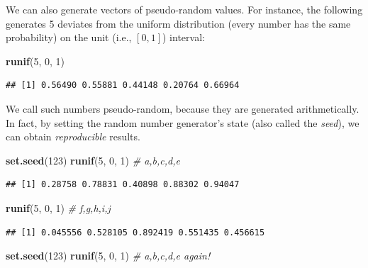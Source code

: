 \documentclass[10pt,b5paper,krantz1]{krantz}
\newenvironment{Shaded}{\begin{snugshade}}{\end{snugshade}}
\newcommand{\CommentTok}[1]{\textcolor[rgb]{0.37,0.37,0.37}{\textit{#1}}}
\newcommand{\DecValTok}[1]{\textcolor[rgb]{0.06,0.06,0.06}{#1}}
\newcommand{\KeywordTok}[1]{\textcolor[rgb]{0.27,0.27,0.27}{\textbf{#1}}}
\newcommand{\NormalTok}[1]{#1}
\begin{document}
We can also generate vectors of pseudo-random values.
For instance, the following generates 5 deviates from the uniform distribution
(every number has the same probability) on the unit (i.e., \([0,1]\)) interval:

\begin{Shaded}
\begin{Highlighting}[]
\KeywordTok{runif}\NormalTok{(}\DecValTok{5}\NormalTok{, }\DecValTok{0}\NormalTok{, }\DecValTok{1}\NormalTok{)}
\end{Highlighting}
\end{Shaded}

\begin{verbatim}
## [1] 0.56490 0.55881 0.44148 0.20764 0.66964
\end{verbatim}

We call such numbers pseudo-random, because they are generated arithmetically.
In fact, by setting the random number generator's state (also called the \emph{seed}),
we can obtain \emph{reproducible} results.

\begin{Shaded}
\begin{Highlighting}[]
\KeywordTok{set.seed}\NormalTok{(}\DecValTok{123}\NormalTok{)}
\KeywordTok{runif}\NormalTok{(}\DecValTok{5}\NormalTok{, }\DecValTok{0}\NormalTok{, }\DecValTok{1}\NormalTok{) }\CommentTok{# a,b,c,d,e}
\end{Highlighting}
\end{Shaded}

\begin{verbatim}
## [1] 0.28758 0.78831 0.40898 0.88302 0.94047
\end{verbatim}

\begin{Shaded}
\begin{Highlighting}[]
\KeywordTok{runif}\NormalTok{(}\DecValTok{5}\NormalTok{, }\DecValTok{0}\NormalTok{, }\DecValTok{1}\NormalTok{) }\CommentTok{# f,g,h,i,j}
\end{Highlighting}
\end{Shaded}

\begin{verbatim}
## [1] 0.045556 0.528105 0.892419 0.551435 0.456615
\end{verbatim}

\begin{Shaded}
\begin{Highlighting}[]
\KeywordTok{set.seed}\NormalTok{(}\DecValTok{123}\NormalTok{)}
\KeywordTok{runif}\NormalTok{(}\DecValTok{5}\NormalTok{, }\DecValTok{0}\NormalTok{, }\DecValTok{1}\NormalTok{) }\CommentTok{# a,b,c,d,e again!}
\end{Highlighting}
\end{Shaded}
\end{document}
